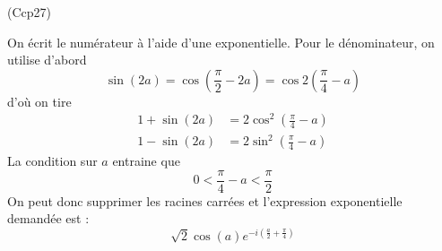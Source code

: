 \begin{tiny}(Ccp27)\end{tiny} On écrit le numérateur à l'aide d'une exponentielle. Pour le dénominateur, on utilise d'abord
\begin{displaymath}
 \sin(2a) = \cos\left(\frac{\pi}{2}-2a \right)
= \cos 2 \left(\frac{\pi}{4}-a \right)
\end{displaymath}
d'où on tire
\begin{displaymath}
 \begin{aligned}
  1+\sin(2a) &= 2\cos^2\left( \frac{\pi}{4}-a\right) \\
  1-\sin(2a) &= 2\sin^2\left( \frac{\pi}{4}-a\right)
 \end{aligned}
\end{displaymath}
La condition sur $a$ entraine que 
\begin{displaymath}
 0<\frac{\pi}{4}-a<\frac{\pi}{2}
\end{displaymath}
On peut donc supprimer les racines carrées et l'expression exponentielle demandée est :
\begin{displaymath}
 \sqrt{2}\cos(a)e^{-i\left( \frac{a}{2}+\frac{\pi}{4}\right) }
\end{displaymath}
